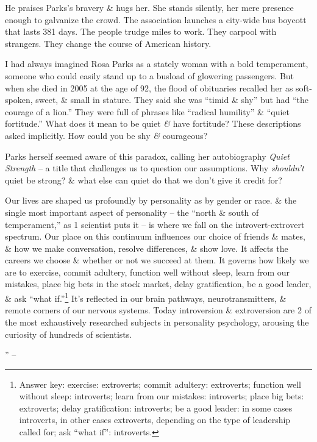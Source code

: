 \documentclass{article}
\numberwithin{equation}{section}
\begin{document}
He praises Parks's bravery \& hugs her. She stands silently, her mere presence enough to galvanize the crowd. The association launches a city-wide bus boycott that lasts 381 days. The people trudge miles to work. They carpool with strangers. They change the course of American history.

I had always imagined Rosa Parks as a stately woman with a bold temperament, someone who could easily stand up to a busload of glowering passengers. But when she died in 2005 at the age of 92, the flood of obituaries recalled her as soft-spoken, sweet, \& small in stature. They said she was ``timid \& shy'' but had ``the courage of a lion.'' They were full of phrases like ``radical humility'' \& ``quiet fortitude.'' What does it mean to be quiet \textit{\&} have fortitude? These descriptions asked implicitly. How could you be shy \textit{\&} courageous?

Parks herself seemed aware of this paradox, calling her autobiography \textit{Quiet Strength} -- a title that challenges us to question our assumptions. Why \textit{shouldn't} quiet be strong? \& what else can quiet do that we don't give it credit for?

Our lives are shaped us profoundly by personality as by gender or race. \& the single most important aspect of personality -- the ``north \& south of temperament,'' as 1 scientist puts it -- is where we fall on the introvert-extrovert spectrum. Our place on this continuum influences our choice of friends \& mates, \& how we make conversation, resolve differences, \& show love. It affects the careers we choose \& whether or not we succeed at them. It governs how likely we are to exercise, commit adultery, function well without sleep, learn from our mistakes, place big bets in the stock market, delay gratification, be a good leader, \& ask ``what if.''\footnote{Answer key: exercise: extroverts; commit adultery: extroverts; function well without sleep: introverts; learn from our mistakes: introverts; place big bets: extroverts; delay gratification: introverts; be a good leader: in some cases introverts, in other cases extroverts, depending on the type of leadership called for; ask ``what if'': introverts.} It's reflected in our brain pathways, neurotransmitters, \& remote corners of our nervous systems. Today introversion \& extroversion are 2 of the most exhaustively researched subjects in personality psychology, arousing the curiosity of hundreds of scientists.

'' -- \cite[pp. 13--]{Cain2013}
\end{document}

